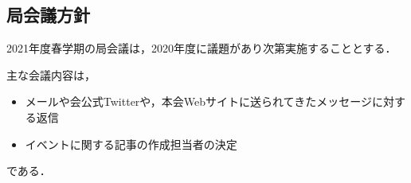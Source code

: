 \subsection*{局会議方針}


2021年度春学期の局会議は，2020年度に議題があり次第実施することとする．

主な会議内容は，
\begin{itemize}
    \item メールや会公式Twitterや，本会Webサイトに送られてきたメッセージに対する返信
    \item イベントに関する記事の作成担当者の決定
\end{itemize}
である．

